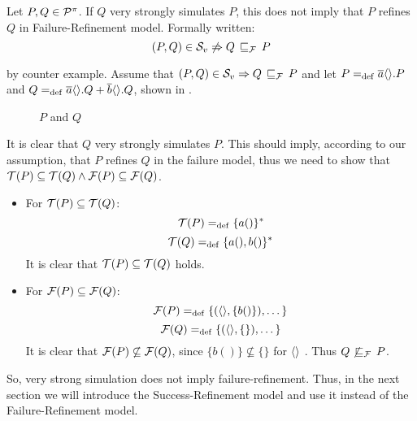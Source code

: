\begin{rem}
\label{cor_sim_failure_refinement}
Let $P,Q\in\mathcal P^{\pi}$. If $Q$ very strongly simulates $P$, this does not imply that $P$ refines $Q$ in Failure-Refinement model. Formally written:
    \[(P,Q)\in{}\simuv  \not\Rightarrow Q \refiF P\]
\end{rem}%
\begin{prf}
by counter example. Assume that $(P,Q)\in{}\simuv \Rightarrow Q \refiF P$ and let $P=_{\mathrm{def}}\overline{a}\langle\rangle.P$ and $Q=_{\mathrm{def}}\overline{a}\langle\rangle.Q + \overline{b}\langle\rangle.Q$, shown in .
\begin{figure}[H]%
\centering
{}%
\qquad
{}%
\caption{$P$ and $Q$}
\label{vm_and_vmHalf}
\end{figure}

It is clear that $Q$ very strongly simulates $P$. This should imply, according to our assumption, that $P$ refines $Q$ in the failure model, thus we need to show that $\Traces[P]\subseteq\Traces[Q] \wedge \Failures[P]\subseteq\Failures[Q]$.
\begin{itemize}
\item For $\Traces[P]\subseteq\Traces[Q]$:
    \[\Traces[P] \define \{a()\}^\ast\]
    \[\Traces[Q] \define \{a(),b()\}^\ast\]
It is clear that $\Traces[P]\subseteq\Traces[Q]$ holds. 
\item For $\Failures[P]\subseteq\Failures[Q]$:
    \[\Failures[P] \define \{(\out{}{},\{b()\}),\dots\}\]
    \[\Failures[Q] \define \{(\out{}{},\{\}),\dots\}\]
It is clear that $\Failures[P]\not\subseteq\Failures[Q]$, since $\{b()\} \not\subseteq \{\}$ for $\overline{}\langle\rangle$ . Thus $Q \not\refiF P$.
\end{itemize}
So, very strong simulation does not imply failure-refinement. Thus, in the next section we will introduce the Success-Refinement model and use it instead of the Failure-Refinement model.
\end{prf}